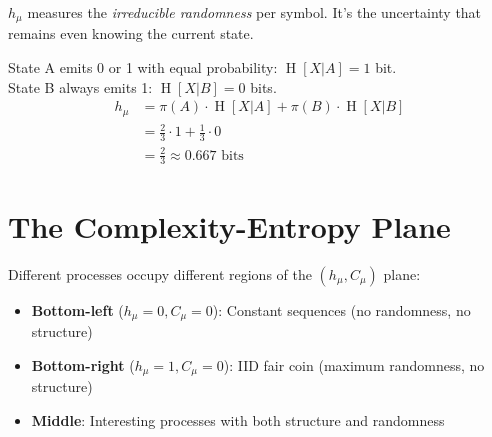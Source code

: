 \documentclass[11pt,a4paper]{article}
\theoremstyle{definition}
\theoremstyle{plain}
\newcommand{\Cmu}{C_\mu}
\newcommand{\hmu}{h_\mu}
\DeclareMathOperator{\Ent}{H}
\begin{document}
\begin{intuition}
$\hmu$ measures the \emph{irreducible randomness} per symbol. It's the uncertainty that remains even knowing the current state.
\end{intuition}

\begin{example}[title=Computing $\hmu$ for Golden Mean]
State A emits 0 or 1 with equal probability: $\Ent[X|A] = 1$ bit.\\
State B always emits 1: $\Ent[X|B] = 0$ bits.
\begin{align*}
    \hmu &= \pi(A) \cdot \Ent[X|A] + \pi(B) \cdot \Ent[X|B] \\
    &= \frac{2}{3} \cdot 1 + \frac{1}{3} \cdot 0 \\
    &= \frac{2}{3} \approx 0.667 \text{ bits}
\end{align*}
\end{example}

\section{The Complexity-Entropy Plane}
\label{sec:complexity-entropy}

Different processes occupy different regions of the $(\hmu, \Cmu)$ plane:

\begin{center}
\end{center}

\begin{itemize}
    \item \textbf{Bottom-left} ($\hmu = 0, \Cmu = 0$): Constant sequences (no randomness, no structure)
    \item \textbf{Bottom-right} ($\hmu = 1, \Cmu = 0$): IID fair coin (maximum randomness, no structure)
    \item \textbf{Middle}: Interesting processes with both structure and randomness
\end{itemize}
\end{document}
